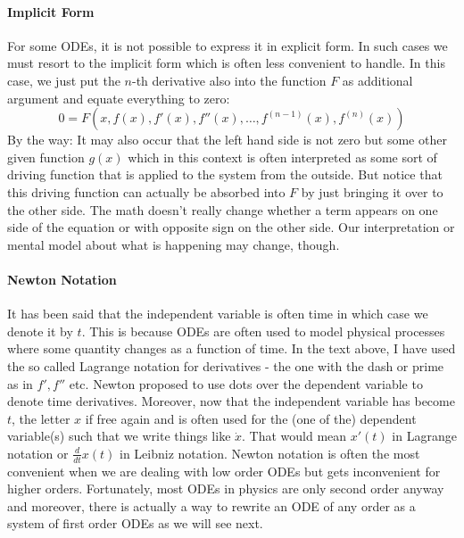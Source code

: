 \paragraph{Implicit Form}
For some ODEs, it is not possible to express it in explicit form. In such cases we must resort to the implicit form which is often less convenient to handle. In this case, we just put the $n$-th derivative also into the function $F$ as additional argument and equate everything to zero:
\begin{equation}
0 = F(x, f(x), f'(x), f''(x), \ldots, f^{(n-1)}(x), f^{(n)}(x))
\end{equation}
By the way: It may also occur that the left hand side is not zero but some other given function $g(x)$ which in this context is often interpreted as some sort of driving function that is applied to the system from the outside. But notice that this driving function can actually be absorbed into $F$ by just bringing it over to the other side. The math doesn't really change whether a term appears on one side of the equation or with opposite sign on the other side. Our interpretation or mental model about what is happening may change, though.


\paragraph{Newton Notation}
It has been said that the independent variable is often time in which case we denote it by $t$. This is because ODEs are often used to model physical processes where some quantity changes as a function of time. In the text above, I have used the so called Lagrange notation for derivatives - the one with the dash or prime as in $f', f''$ etc. Newton proposed to use dots over the dependent variable to denote time derivatives. Moreover, now that the independent variable has become $t$, the letter $x$ if free again and is often used for the (one of the) dependent variable(s) such that we write things like $\dot{x}$. That would mean $x'(t)$ in Lagrange notation or $\frac{d}{dt} x(t)$ in Leibniz notation. Newton notation is often the most convenient when we are dealing with low order ODEs but gets inconvenient for higher orders. Fortunately, most ODEs in physics are only second order anyway and moreover, there is actually a way to rewrite an ODE of any order as a system of first order ODEs as we will see next.

